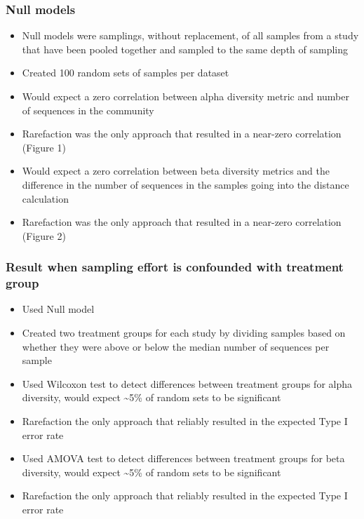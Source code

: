 \documentclass[
]{article}
\begin{document}
\hypertarget{null-models}{%
\subsubsection{Null models}\label{null-models}}

\begin{itemize}
\item
  Null models were samplings, without replacement, of all samples from a
  study that have been pooled together and sampled to the same depth of
  sampling
\item
  Created 100 random sets of samples per dataset
\item
  Would expect a zero correlation between alpha diversity metric and
  number of sequences in the community
\item
  Rarefaction was the only approach that resulted in a near-zero
  correlation (Figure 1)
\item
  Would expect a zero correlation between beta diversity metrics and the
  difference in the number of sequences in the samples going into the
  distance calculation
\item
  Rarefaction was the only approach that resulted in a near-zero
  correlation (Figure 2)
\end{itemize}

\hypertarget{result-when-sampling-effort-is-confounded-with-treatment-group}{%
\subsubsection{Result when sampling effort is confounded with treatment
group}\label{result-when-sampling-effort-is-confounded-with-treatment-group}}

\begin{itemize}
\item
  Used Null model
\item
  Created two treatment groups for each study by dividing samples based
  on whether they were above or below the median number of sequences per
  sample
\item
  Used Wilcoxon test to detect differences between treatment groups for
  alpha diversity, would expect \textasciitilde5\% of random sets to be
  significant
\item
  Rarefaction the only approach that reliably resulted in the expected
  Type I error rate
\item
  Used AMOVA test to detect differences between treatment groups for
  beta diversity, would expect \textasciitilde5\% of random sets to be
  significant
\item
  Rarefaction the only approach that reliably resulted in the expected
  Type I error rate
\end{itemize}
\end{document}
